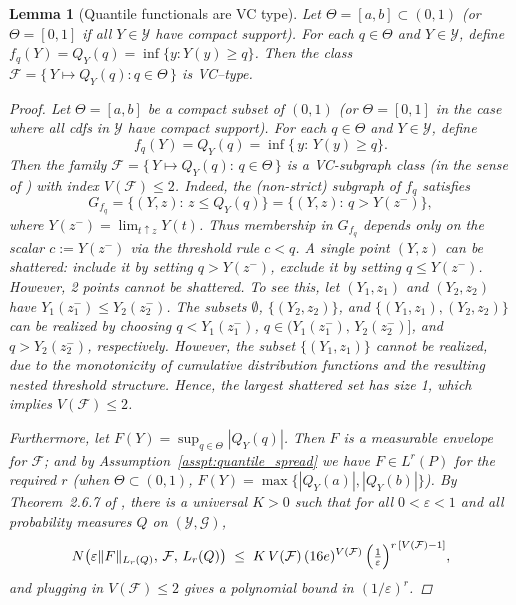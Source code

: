 \documentclass[12pt]{article}
\newtheorem{lemma}{Lemma}
\begin{document}
\begin{lemma}[Quantile functionals are VC type]
\label{lemma:quantile-vc-subgraph}
Let $\Theta=[a,b]\subset(0,1)$ (or $\Theta=[0,1]$ if all $Y\in\mathcal{Y}$ have compact support). For each $q\in\Theta$ and $Y\in\mathcal{Y}$, define
$f_q(Y)=Q_Y(q)=\inf\{y: Y(y)\ge q\}$.
Then the class $\mathcal{F}=\{\,Y\mapsto Q_Y(q): q\in\Theta\,\}$ is VC–type.
\begin{proof}
Let $\Theta=[a,b]$ be a compact subset of $(0,1)$ (or $\Theta=[0,1]$ in the case where all cdfs in $\mathcal{Y}$ have compact support). For each $q\in\Theta$ and $Y\in\mathcal{Y}$, define
\[
  f_q(Y)=Q_Y(q)=\inf\{\,y:\,Y(y)\ge q\}.
\]
Then the family $\mathcal{F}=\{\,Y\mapsto Q_Y(q):\,q\in\Theta\,\}$ is a VC-subgraph class (in the sense of \citet[\S2.6.2]{vaart1996weak}) with index $V(\mathcal{F})\le 2$. Indeed, the (non-strict) subgraph of $f_q$ satisfies
\[
  G_{f_q}
  =\bigl\{(Y,z):\, z\le Q_Y(q)\bigr\}
  =\bigl\{(Y,z):\, q>Y(z^-)\bigr\},
\]
where $Y(z^-)=\lim_{t\uparrow z}Y(t)$. Thus membership in $G_{f_q}$ depends only on the scalar
$c:=Y(z^-)$ via the threshold rule $c<q$. A single point $(Y,z)$ can be shattered: include it by setting $q>Y(z^-)$, exclude it by setting $q\le Y(z^-)$. However, 2 points cannot be shattered. To see this, let $\left(Y_1,z_1\right)$ and $\left(Y_2,z_2\right)$ have $Y_1(z_1^-) \le Y_2(z_2^-)$. The subsets $\emptyset$, $\{(Y_2,z_2)\}$, and $\{(Y_1,z_1),(Y_2,z_2)\}$ can be realized by choosing $q<Y_1(z_1^-)$, $q\in\bigl(Y_1(z_1^-),\,Y_2(z_2^-)\bigr]$, and $q>Y_2(z_2^-)$, respectively. However, the subset $\{(Y_1,z_1)\}$ cannot be realized, due to the monotonicity of cumulative distribution functions and the resulting nested threshold structure. Hence, the largest shattered set has size 1, which implies $V(\mathcal{F})\le 2$.

Furthermore, let $F(Y)=\sup_{q\in\Theta}|Q_Y(q)|$. Then $F$ is a measurable envelope for $\mathcal{F}$; and by Assumption~\ref{asspt:quantile_spread} we have $F\in L^r(P)$ for the required $r$ (when $\Theta\subset(0,1)$, $F(Y)=\max\{|Q_Y(a)|,|Q_Y(b)|\}$). By Theorem~2.6.7 of \citet{vaart1996weak}, there is a universal $K>0$ such that for all $0<\varepsilon<1$ and all probability measures $Q$ on $(\mathcal{Y},\mathcal{G})$,
\[
  N\bigl(\varepsilon \|F\|_{L_r(Q)},\,\mathcal{F},\,L_r(Q)\bigr)
  \;\le\;
  K\,V(\mathcal{F})\,(16e)^{V(\mathcal{F})}\,
  \Bigl(\tfrac{1}{\varepsilon}\Bigr)^{r\,[V(\mathcal{F})-1]},
\]
and plugging in $V(\mathcal{F})\le 2$ gives a polynomial bound in $(1/\varepsilon)^r$.
\end{proof}
\end{lemma}
\end{document}
